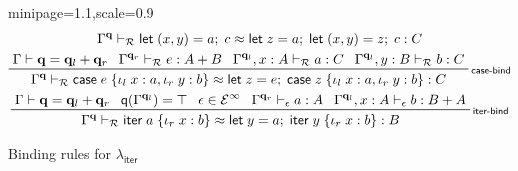 \documentclass[acmsmall,screen,anonymous,review]{acmart}
\newcommand{\mc}[1]{\ensuremath{\mathcal{#1}}}
\newcommand{\mb}[1]{\ensuremath{\mathbf{#1}}}
\newcommand{\ms}[1]{\ensuremath{\mathsf{#1}}}
\newcommand{\lto}{:}
\newcommand{\linl}[1]{\iota_l\;{#1}}
\newcommand{\linr}[1]{\iota_r\;{#1}}
\newcommand{\letexpr}[3]{\ensuremath{\ms{let}\;#1 = #2;\;#3}}
\newcommand{\caseexpr}[5]{\ms{case}\;#1\;\{\linl{#2} \lto #3, \linr{#4} \lto #5\}}
\newcommand{\liter}[3]{\ms{iter}\;#1\;\{ \linr{#2} \lto #3 \}}
\newcommand{\einf}[1]{#1 \in \mc{E}^\infty}
\newcommand{\qsp}[4]{#1 \vdash #2 = #3 + #4}
\newcommand{\rle}[1]{{\scriptsize\textsf{#1}}}
\newcommand{\hasty}[4]{#1 \vdash_{#2} #3: {#4}}
\newcommand{\teqv}{\approx}
\newcommand{\tmeq}[5]{#1 \vdash_{#2} #3 \teqv #4 : {#5}}
\newcommand{\subiterexp}{\texorpdfstring{\(\lambda_{\ms{iter}}\)}{lambda-iter}}
\newcommand{\alquant}{\ms{q}}
\begin{document}
\begin{figure}
\begin{adjustbox}{minipage=1.1\textwidth,scale=0.9}
\begin{gather*}
      {
        \tmeq{\Gamma^{\mb{q}}}{\mc{R}}
          {\letexpr{(x, y)}{a}{c}}
          {\letexpr{z}{a}{\letexpr{(x, y)}{z}{c}}}
          {C}
      } \\
    \prftree[r]{\rle{case-bind}}
      {\qsp{\Gamma}{\mb{q}}{\mb{q}_l}{\mb{q}_r}}
      {\hasty{\Gamma^{\mb{q}_r}}{\mc{R}}{e}{A + B}}
      {\hasty{\Gamma^{\mb{q}_l}, x : A}{\mc{R}}{a}{C}}
      {\hasty{\Gamma^{\mb{q}_l}, y : B}{\mc{R}}{b}{C}}
      {
        \tmeq{\Gamma^{\mb{q}}}{\mc{R}}
        {\caseexpr{e}{x}{a}{y}{b}}
        {\letexpr{z}{e}{\caseexpr{z}{x}{a}{y}{b}}}
        {C}
      } \\
    \prftree[r]{\rle{iter-bind}}
      {\qsp{\Gamma}{\mb{q}}{\mb{q}_l}{\mb{q}_r}}
      {\alquant(\Gamma^{\mb{q}_l}) = \top}
      {\einf{\epsilon}}
      {\hasty{\Gamma^{\mb{q}_r}}{\epsilon}{a}{A}}
      {\hasty{\Gamma^{\mb{q}_l}, x : A}{\epsilon}{b}{B + A}}
      {\tmeq{\Gamma^{\mb{q}}}{\mc{R}}{\liter{a}{x}{b}}{\letexpr{y}{a}{\liter{y}{x}{b}}}{B}}
  \end{gather*}
  \end{adjustbox}
  \caption{Binding rules for \subiterexp{}}
  \Description{}
  \label{fig:binding-rules}
\end{figure}
\end{document}
